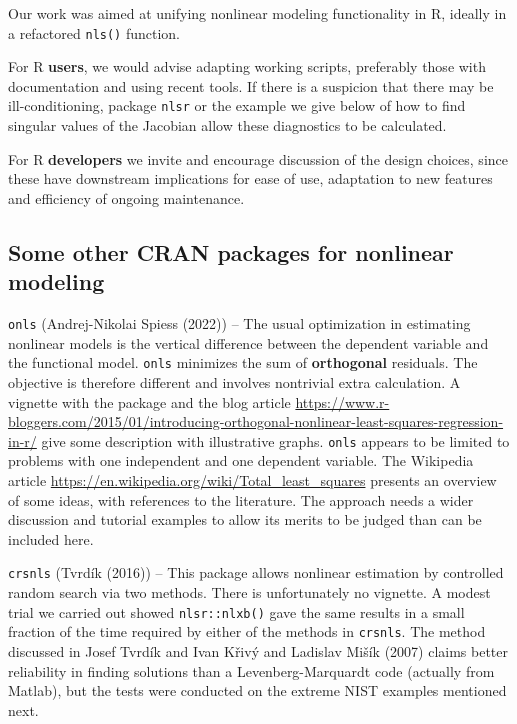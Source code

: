 Our work was aimed at unifying nonlinear modeling functionality in R,
ideally in a refactored \texttt{nls()} function.

For R \textbf{users}, we would advise adapting working scripts, preferably those
with documentation and using recent tools. If there is a suspicion that there
may be ill-conditioning, package \texttt{nlsr} or the example we give below of how to
find singular values of the Jacobian allow these diagnostics to be calculated.

For R \textbf{developers} we invite and encourage discussion of the design choices, since these
have downstream implications for ease of use, adaptation to new features and
efficiency of ongoing maintenance.

\hypertarget{some-other-cran-packages-for-nonlinear-modeling}{%
\subsection{Some other CRAN packages for nonlinear modeling}\label{some-other-cran-packages-for-nonlinear-modeling}}

\texttt{onls} (Andrej-Nikolai Spiess (2022)) -- The usual optimization in estimating nonlinear models
is the vertical difference between the dependent variable and the functional
model. \texttt{onls} minimizes the sum of \textbf{orthogonal} residuals. The objective is
therefore different and involves nontrivial extra calculation. A vignette with
the package and the blog article
\url{https://www.r-bloggers.com/2015/01/introducing-orthogonal-nonlinear-least-squares-regression-in-r/}
give some description with illustrative graphs. \texttt{onls} appears to be limited to
problems with one independent and one dependent variable. The Wikipedia article
\url{https://en.wikipedia.org/wiki/Total_least_squares} presents an overview of some
ideas, with references to the literature. The approach needs a wider
discussion and tutorial examples to allow its merits to be judged than can be
included here.

\texttt{crsnls} (Tvrdík (2016)) -- This package allows nonlinear estimation by
controlled random search via two methods. There is unfortunately no vignette.
A modest trial we carried out showed \texttt{nlsr::nlxb()} gave the same results in
a small fraction of the time required by either of the methods in \texttt{crsnls}. The
method discussed in Josef Tvrdík and Ivan Křivý and Ladislav Mišík (2007) claims better reliability in finding solutions
than a Levenberg-Marquardt code (actually from Matlab), but the tests were conducted
on the extreme NIST examples mentioned next.

